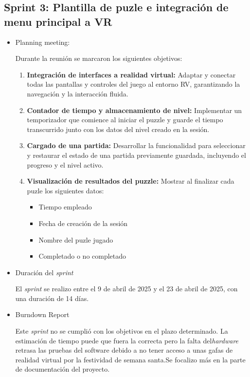 \subsection{\textbf{Sprint 3: Plantilla de puzle e integración de menu principal a VR } }
\begin{itemize}
    \item {Planning meeting:}
    
Durante la reunión se marcaron los siguientes objetivos:
\begin{enumerate}
  \item \textbf{Integración de interfaces a realidad virtual:}  
    Adaptar y conectar todas las pantallas y controles del juego al entorno RV, garantizando la navegación y la interacción fluida.

  \item \textbf{Contador de tiempo y almacenamiento de nivel:}  
    Implementar un temporizador que comience al iniciar el puzzle y guarde el tiempo transcurrido junto con los datos del nivel creado en la sesión.

  \item \textbf{Cargado de una partida:}  
    Desarrollar la funcionalidad para seleccionar y restaurar el estado de una partida previamente guardada, incluyendo el progreso y el nivel activo.

  \item \textbf{Visualización de resultados del puzzle:}  
    Mostrar al finalizar cada puzle los siguientes datos:  
    \begin{itemize}
      \item Tiempo empleado  
      \item Fecha de creación de la sesión  
      \item Nombre del puzle jugado
      \item Completado o no completado
    \end{itemize}
\end{enumerate}
    \item {Duración del \textit{sprint}}
    
El \textit{sprint } se realizo entre el 9 de abril de 2025 y el 23 de abril de 2025, con una duración de 14 días.
    \item {Burndown Report}
    
Este \textit{sprint} no se cumplió con los objetivos en el plazo determinado. La estimación de tiempo puede que fuera la correcta pero la falta del\textit{hardware} retrasa las pruebas del software debido a no tener acceso a unas gafas de realidad virtual por la festividad de semana santa.Se focalizo más en la parte de documentación del proyecto.


\end{itemize}
